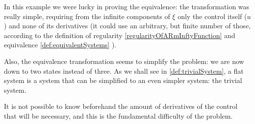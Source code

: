 \documentclass[12pt]{article}
\begin{document}
\begin{example}
  In this example we were lucky in proving the equivalence: the transformation
  was really simple, requiring from the infinite components of $\xi$ only
  the control itself ($u$) and none of its derivatives (it could use an
  arbitrary, but finite number of those, according to the definition of
  regularity \ref{regularityOfARmInftyFunction} and equivalence \ref{def:equivalentSystems} ).
  
  Also, the equivalence transformation seems to simplify the problem: we
  are now down to two states instead of three. As we shall see in
  \ref{def:trivialSystem}, a flat system is a system that can be simplified
  to an even simpler system: the trivial system.
  
  It is not possible to know beforehand the amount of derivatives of the control
  that will be necessary, and this is the fundamental difficulty of the problem.
\end{example}
\end{document}
